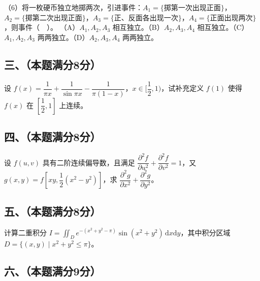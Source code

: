 \documentclass[UTF8,12pt]{ctexart}
\begin{document}
（6）将一枚硬币独立地掷两次，引进事件：\(\displaystyle A_1=\{\text{掷第一次出现正面}\}\)，\(\displaystyle A_2=\{\text{掷第二次出现正面}\}\)，\(\displaystyle A_3=\{\text{正、反面各出现一次}\}\)，\(\displaystyle A_4=\{\text{正面出现两次}\}\)，则事件（　）。
（A）\(\displaystyle A_1,\allowbreak A_2,\allowbreak A_3\) 相互独立。（B）\(\displaystyle A_2,\allowbreak A_3,\allowbreak A_4\) 相互独立。（C）\(\displaystyle A_1,\allowbreak A_2,\allowbreak A_3\) 两两独立。（D）\(\displaystyle A_2,\allowbreak A_3,\allowbreak A_4\) 两两独立。


\subsection*{三、（本题满分8分）}

设 \(\displaystyle f(x)=\dfrac{\displaystyle 1}{\displaystyle \pi x}+\dfrac{\displaystyle 1}{\displaystyle \sin\pi x}-\dfrac{\displaystyle 1}{\displaystyle \pi(1-x)}\)，\(\displaystyle x\in[\dfrac{\displaystyle 1}{\displaystyle 2},\allowbreak 1)\)，试补充定义 \(\displaystyle f(1)\) 使得 \(\displaystyle f(x)\) 在 \(\displaystyle [\dfrac{\displaystyle 1}{\displaystyle 2},\allowbreak 1]\) 上连续。


\subsection*{四、（本题满分8分）}

设 \(\displaystyle f(u,\allowbreak v)\) 具有二阶连续偏导数，且满足 \(\displaystyle \dfrac{\displaystyle \partial^2f}{\displaystyle \partial u^2}+\dfrac{\displaystyle \partial^2f}{\displaystyle \partial v^2}=1\)，又 \(\displaystyle g(x,\allowbreak y)=f[xy,\allowbreak \dfrac{\displaystyle 1}{\displaystyle 2}(x^2-y^2)]\)，求 \(\displaystyle \dfrac{\displaystyle \partial^2g}{\displaystyle \partial x^2}+\dfrac{\displaystyle \partial^2g}{\displaystyle \partial y^2}\)。


\subsection*{五、（本题满分8分）}

计算二重积分 \(\displaystyle I=\displaystyle \iint_D e^{-(x^2+y^2-\pi)}\sin(x^2+y^2)\,\mathrm dx\mathrm dy\)，其中积分区域 \(\displaystyle D=\{(x,\allowbreak y)\mid x^2+y^2\le\pi\}\)。


\subsection*{六、（本题满分9分）}
\end{document}
